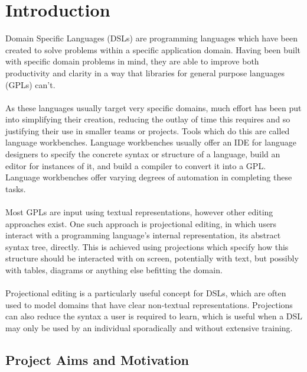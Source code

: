 \documentclass{article}
\begin{document}

\clearpage
\tableofcontents
\clearpage

\section{Introduction}

Domain Specific Languages (DSLs) are programming languages which have been created to solve problems within a specific application domain. Having been built with specific domain problems in mind, they are able to improve both productivity and clarity in a way that libraries for general purpose languages (GPLs) can't. 
\\
\\
As these languages usually target very specific domains, much effort has been put into simplifying their creation, reducing the outlay of time this requires and so justifying their use in smaller teams or projects. Tools which do this are called language workbenches. Language workbenches usually offer an IDE for language designers to specify the concrete syntax or structure of a language, build an editor for instances of it, and build a compiler to convert it into a GPL. Language workbenches offer varying degrees of automation in completing these tasks.
\\
\\
Most GPLs are input using textual representations, however other editing approaches exist. One such approach is projectional editing, in which users interact with a programming language's internal representation, its abstract syntax tree, directly. This is achieved using projections which specify how this structure should be interacted with on screen, potentially with text, but possibly with tables, diagrams or anything else befitting the domain. 
\\
\\
Projectional editing is a particularly useful concept for DSLs, which are often used to model domains that have clear non-textual representations. Projections can also reduce the syntax a user is required to learn, which is useful when a DSL may only be used by an individual sporadically and without extensive training.

\subsection{Project Aims and Motivation}
\end{document}
